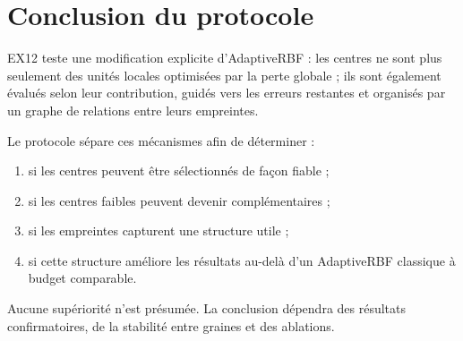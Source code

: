\documentclass[11pt,a4paper]{article}
\begin{document}
\section{Conclusion du protocole}

EX12 teste une modification explicite d'AdaptiveRBF :
les centres ne sont plus seulement des unités locales optimisées par
la perte globale ; ils sont également évalués selon leur contribution,
guidés vers les erreurs restantes et organisés par un graphe de
relations entre leurs empreintes.

Le protocole sépare ces mécanismes afin de déterminer :
\begin{enumerate}
  \item si les centres peuvent être sélectionnés de façon fiable ;
  \item si les centres faibles peuvent devenir complémentaires ;
  \item si les empreintes capturent une structure utile ;
  \item si cette structure améliore les résultats au-delà d'un
  AdaptiveRBF classique à budget comparable.
\end{enumerate}

Aucune supériorité n'est présumée. La conclusion dépendra des résultats
confirmatoires, de la stabilité entre graines et des ablations.
\end{document}
